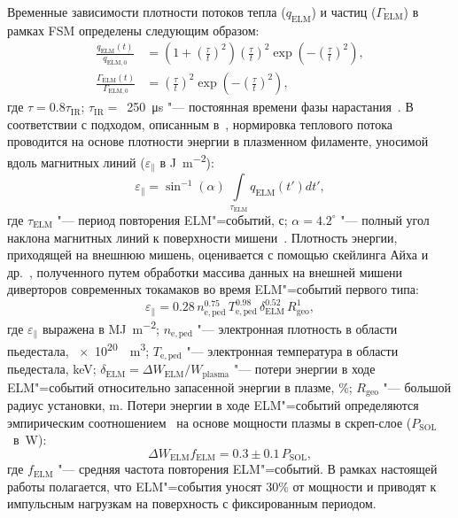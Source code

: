 Временные зависимости плотности потоков тепла (\( q_\mathrm{ELM} \)) и частиц (\( \Gamma_\mathrm{ELM} \)) в рамках FSM определены следующим образом:
\begin{subequations}
	\label{eq:ch3/elm_fluxes}
	\begin{align}
		\frac{q_{\mathrm{ELM}}(t)}{q_{\mathrm{ELM,0}}}           & =\left(1+\left(\frac{\tau}{t}\right)^2\right)\left(\frac{\tau}{t}\right)^2\exp\left(-\left(\frac{\tau}{t}\right)^2\right),\label{eq:elm_heat_flux} \\
		\frac{\Gamma_{\mathrm{ELM}}(t)}{\Gamma_{\mathrm{ELM,0}}} & =\left(\frac{\tau}{t}\right)^2\exp\left(-\left(\frac{\tau}{t}\right)^2\right), \label{eq:elm_part_flux}
	\end{align}
\end{subequations}
где $\tau=\num{0.8}\tau_{\mathrm{IR}}$; $\tau_{\mathrm{IR}}=$~\SI{250}{\micro\second} "--- постоянная времени фазы нарастания~\cite{Eich2017}. В соответствии с подходом, описанным в~\cite{VandenKerkhof2021}, нормировка теплового потока проводится на основе плотности энергии в плазменном филаменте, уносимой вдоль магнитных линий ($\varepsilon_\parallel$ в \si{\joule\per\meter\squared}):
\begin{equation}
	\label{eq:ch3/norm_elm_hf}
	\varepsilon_\parallel=\sin^{-1}(\alpha)\,\int\limits_{\tau_{\mathrm{ELM}}}q_{\mathrm{ELM}}(t')dt',
\end{equation}
где $\tau_{\mathrm{ELM}}$ "--- период повторения ELM"=событий, с; $\alpha=4.2^{\circ}$ "--- полный угол наклона магнитных линий к поверхности мишени~\cite{Pitts2019, Eich2017, Pitts2017}. Плотность энергии, приходящей на внешнюю мишень, оценивается с помощью скейлинга Айха и др.~\cite{Eich2017}, полученного путем обработки массива данных на внешней мишени диверторов современных токамаков во время ELM"=событий первого типа:
\begin{equation}
	\label{eq:ch3/parallel_elm_fluence}
	\varepsilon_\parallel=0.28 \, n_{\mathrm{e,ped}}^{0.75}\, T_{\mathrm{e,ped}}^{0.98}\, \delta_{\mathrm{ELM}}^{0.52}\, R_{\mathrm{geo}}^{1},
\end{equation}
где $\varepsilon_\parallel$ выражена в \si{\mega\joule\per\meter\squared}; $n_{\mathrm{e,ped}}$ "--- электронная плотность в области пьедестала, \SI{e20}{\per\meter\cubed}; $T_{\mathrm{e,ped}}$ "--- электронная температура в области пьедестала, \si{\kilo\electronvolt}; $\delta_{\mathrm{ELM}}=\Delta W_{\mathrm{ELM}}/W_{\mathrm{plasma}}$ "--- потери энергии в ходе ELM"=событий относительно запасенной энергии в плазме, \si{\percent}; $R_{\mathrm{geo}}$ "--- большой радиус установки, \si{\meter}. Потери энергии в ходе ELM"=событий определяются эмпирическим соотношением~\cite{Loarte2002} на основе мощности плазмы в скреп-слое ($P_{\mathrm{SOL}}$~в~\si{\watt}):
\begin{equation}
	\Delta W_{\mathrm{ELM}} f_{\mathrm{ELM}}=0.3\pm 0.1 \, P_{\mathrm{SOL}},
\end{equation}
где $f_{\mathrm{ELM}}$ "--- средняя частота повторения ELM"=событий. В рамках настоящей работы полагается, что ELM"=события уносят 30\% от мощности и приводят к импульсным нагрузкам на поверхность с фиксированным периодом.

